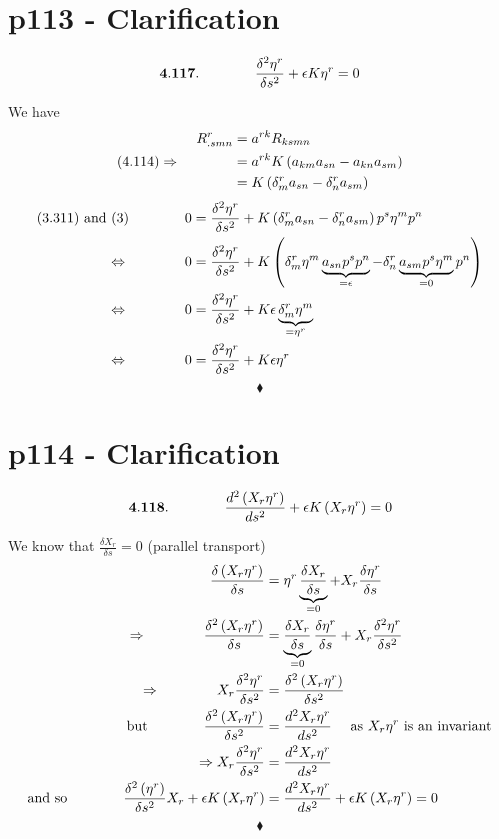 \section{p113 - Clarification}
\begin{tcolorbox}
$$\mathbf{4.117.}\quad\quad\quad\quad \frac{\delta^2 \eta^r}{\delta s^2} + \epsilon K\eta^r =0$$
\end{tcolorbox}
We have
\begin{align}
R^r_{.smn} &= a^{rk} R_{ksmn}\\
\text{(4.114)}\Rightarrow \quad\quad\quad\quad &= a^{rk} K\left(a_{km}a_{sn}-a_{kn}a_{sm}\right)\\
&= K\left(\delta^r_m a_{sn}-\delta^r_n a_{sm}\right)
\end{align}
\begin{align}
\text{(3.311) and (3)}\quad\quad\quad\quad 0 &=\frac{\delta^2 \eta^r}{\delta s^2} +  K\left(\delta^r_m a_{sn}-\delta^r_n a_{sm}\right)p^s\eta^m p^n\\
\Leftrightarrow\quad\quad\quad\quad 0 &=\frac{\delta^2 \eta^r}{\delta s^2} +  K\left(\delta^r_m \eta^m \underbrace{a_{sn}p^s p^n}_{=\epsilon}-\delta^r_n \underbrace{a_{sm}p^s\eta^m}_{=0} p^n\right)\\
\Leftrightarrow\quad\quad\quad\quad 0 &=\frac{\delta^2 \eta^r}{\delta s^2} +  K\epsilon\underbrace{\delta^r_m \eta^m}_{=\eta^r} \\
\Leftrightarrow\quad\quad\quad\quad 0 &=\frac{\delta^2 \eta^r}{\delta s^2} +  K\epsilon\eta^r
\end{align}
$$\blacklozenge$$
\newpage

\section{p114 - Clarification}
\begin{tcolorbox}
$$\mathbf{4.118.}\quad\quad\quad\quad \dv[2]{\left(X_r\eta^r\right)}{s} + \epsilon K\left(X_r\eta^r\right) =0$$
\end{tcolorbox}
We know that $\frac{\delta X_r}{\delta s} = 0$ (parallel transport)
\begin{align}
\frac{\delta \left(X_r\eta^r\right)}{\delta s}&= \eta^r\underbrace{\frac{\delta X_r}{\delta s}}_{=0}+X_r\frac{\delta \eta^r}{\delta s}\\
\Rightarrow\quad\quad\quad\quad \frac{\delta^2 \left(X_r\eta^r\right)}{\delta s}&= \underbrace{\frac{\delta X_r}{\delta s}}_{=0}\frac{\delta \eta^r}{\delta s}+X_r\frac{\delta^2 \eta^r}{\delta s^2}\\
\Rightarrow\quad\quad\quad\quad X_r\frac{\delta^2 \eta^r}{\delta s^2}&= \frac{\delta^2 \left(X_r\eta^r\right)}{\delta s^2}\\
\text{but}\quad\quad\quad\quad \frac{\delta^2 \left(X_r\eta^r\right)}{\delta s^2} &=  \dv[2]{X_r\eta^r}{s} \quad \text{ as } X_r\eta^r \text{ is an invariant}\\
\Rightarrow X_r\frac{\delta^2 \eta^r}{\delta s^2}&=\dv[2]{X_r\eta^r}{s}\\
\text{and so}\quad\quad\quad\quad \frac{\delta^2 \left(\eta^r\right)}{\delta s^2}X_r + \epsilon K\left(X_r\eta^r\right) &= \dv[2]{X_r\eta^r}{s}+ \epsilon K\left(X_r\eta^r\right) = 0
\end{align}
$$\blacklozenge$$
\newpage

